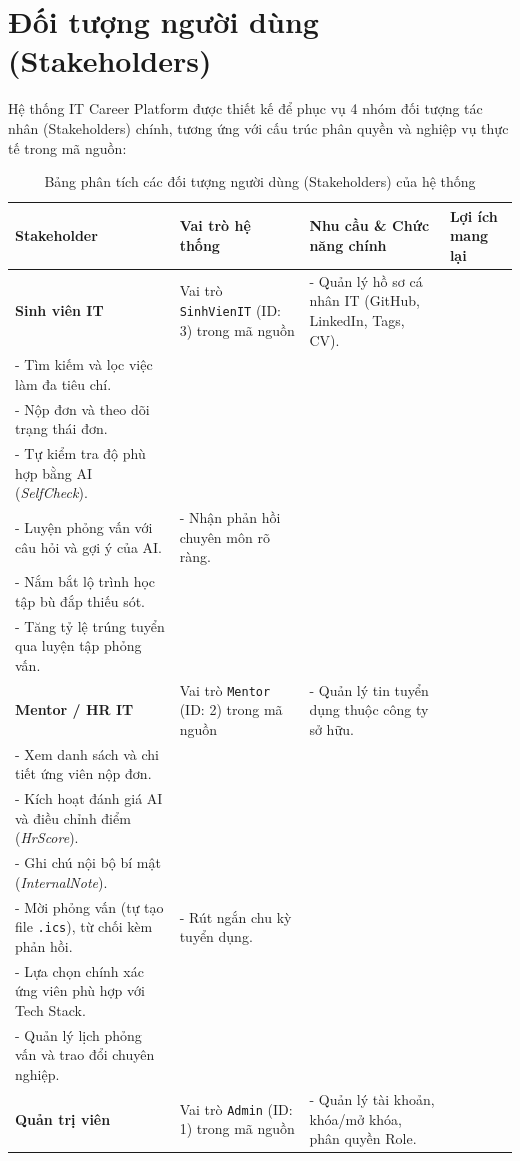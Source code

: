 \section{Đối tượng người dùng (Stakeholders)}
\label{sec:stakeholders}

Hệ thống IT Career Platform được thiết kế để phục vụ 4 nhóm đối tượng tác nhân (Stakeholders) chính, tương ứng với cấu trúc phân quyền và nghiệp vụ thực tế trong mã nguồn:

\begin{table}[htbp]
\centering
\small
\caption{Bảng phân tích các đối tượng người dùng (Stakeholders) của hệ thống}
\label{tab:stakeholders}
\begin{tabularx}{\textwidth}{l p{2.8cm} X p{3.2cm}}
\toprule
\textbf{Stakeholder} & \textbf{Vai trò hệ thống} & \textbf{Nhu cầu \& Chức năng chính} & \textbf{Lợi ích mang lại} \\
\midrule
\textbf{Sinh viên IT} & Vai trò \texttt{SinhVienIT} (ID: 3) trong mã nguồn & 
- Quản lý hồ sơ cá nhân IT (GitHub, LinkedIn, Tags, CV).\\
- Tìm kiếm và lọc việc làm đa tiêu chí.\\
- Nộp đơn và theo dõi trạng thái đơn.\\
- Tự kiểm tra độ phù hợp bằng AI (\textit{SelfCheck}).\\
- Luyện phỏng vấn với câu hỏi và gợi ý của AI. &
- Nhận phản hồi chuyên môn rõ ràng.\\
- Nắm bắt lộ trình học tập bù đắp thiếu sót.\\
- Tăng tỷ lệ trúng tuyển qua luyện tập phỏng vấn.\\
\addlinespace
\textbf{Mentor / HR IT} & Vai trò \texttt{Mentor} (ID: 2) trong mã nguồn &
- Quản lý tin tuyển dụng thuộc công ty sở hữu.\\
- Xem danh sách và chi tiết ứng viên nộp đơn.\\
- Kích hoạt đánh giá AI và điều chỉnh điểm (\textit{HrScore}).\\
- Ghi chú nội bộ bí mật (\textit{InternalNote}).\\
- Mời phỏng vấn (tự tạo file \texttt{.ics}), từ chối kèm phản hồi. &
- Rút ngắn chu kỳ tuyển dụng.\\
- Lựa chọn chính xác ứng viên phù hợp với Tech Stack.\\
- Quản lý lịch phỏng vấn và trao đổi chuyên nghiệp.\\
\addlinespace
\textbf{Quản trị viên} & Vai trò \texttt{Admin} (ID: 1) trong mã nguồn &
- Quản lý tài khoản, khóa/mở khóa, phân quyền Role.\\

\end{tabularx}
\end{table}
